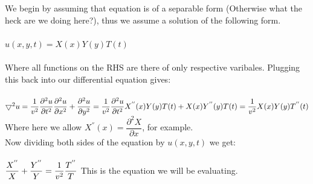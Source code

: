 \documentclass[fleqn]{article}
\begin{document}
\begin{enumerate}
\begin{enumerate}
      \textcolor{hwColor}{
        We begin by assuming that equation is of a separable form (Otherwise what the heck are we doing here?), thus we assume a solution of the following form. \\
        \\
        $u(x,y,t)=X(x)Y(y)T(t)$ \\
        \\
        Where all functions on the RHS are there of only respective varibales. Plugging this back into our differential equation gives: \\
        \\
        $
          \bigtriangledown^2 u=\dfrac{1}{v^2}\dfrac{\partial^2 u}{\partial t^2} \\
          \\
          \dfrac{\partial^2 u}{\partial x^2}+\dfrac{\partial^2 u}{\partial y^2}=\dfrac{1}{v^2}\dfrac{\partial^2 u}{\partial t^2} \\
          \\
          X^{''}(x)Y(y)T(t)+X(x)Y^{''}(y)T(t)=\dfrac{1}{v^2}X(x)Y(y)T^{''}(t) \\
          \\
        $
        Where here we allow $X^{''}(x)=\dfrac{\partial^2 X}{\partial x}$, for example. \\
        Now dividing both sides of the equation by $u(x,y,t)$ we get: \\
        \\
        $
          \dfrac{X^{''}}{X}+\dfrac{Y^{''}}{Y}=\dfrac{1}{v^2}\dfrac{T^{''}}{T} \\
          \\
        $
        This is the equation we will be evaluating.
      }


\end{enumerate}
\end{enumerate}
\end{document}

